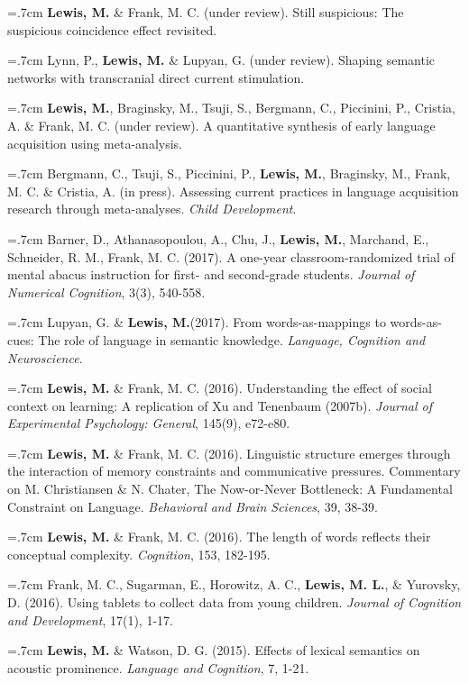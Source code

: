 \documentclass[letterpaper]{article}
\begin{document}
\onehalfspacing

\hangindent=.7cm {\bf Lewis, M.} \& Frank, M. C. (under review). Still suspicious: The suspicious coincidence effect revisited.

\hangindent=.7cm Lynn, P., {\bf Lewis, M.} \& Lupyan, G. (under review). Shaping semantic networks with transcranial direct current stimulation.

\hangindent=.7cm {\bf Lewis, M.}, Braginsky, M., Tsuji, S., Bergmann, C., Piccinini, P., Cristia, A. \& Frank, M. C. (under review). A quantitative synthesis of early language acquisition using meta-analysis. 
  

\hangindent=.7cm Bergmann, C., Tsuji, S., Piccinini, P., {\bf Lewis, M.}, Braginsky, M., Frank, M. C. \& Cristia, A. (in press). Assessing current practices in language acquisition research through meta-analyses. {\it Child Development}.


\hangindent=.7cm Barner, D., Athanasopoulou, A., Chu, J., {\bf Lewis, M.}, Marchand, E., Schneider, R. M., Frank, M. C. (2017). A one-year classroom-randomized trial of mental abacus instruction for first- and second-grade students.  {\it Journal of Numerical Cognition}, 3(3), 540-558.

\hangindent=.7cm Lupyan, G. \& {\bf Lewis, M.}(2017). From words-as-mappings to words-as-cues: The role of language in semantic knowledge. {\it Language, Cognition and Neuroscience}.

  \hangindent=.7cm {\bf Lewis, M.} \& Frank, M. C. (2016). Understanding the effect of social context on learning: A replication of Xu and Tenenbaum (2007b). {\it Journal of Experimental Psychology: General}, 145(9), e72-e80.

 \hangindent=.7cm {\bf Lewis, M.} \& Frank, M. C. (2016). Linguistic structure emerges through the interaction of memory constraints and communicative pressures. Commentary on M. Christiansen \& N. Chater, The Now-or-Never Bottleneck: A Fundamental Constraint on Language. {\it Behavioral and Brain Sciences}, 39, 38-39.
 
  \hangindent=.7cm {\bf Lewis, M.} \& Frank, M. C. (2016). The length of words reflects their conceptual complexity. {\it Cognition}, 153, 182-195.

 \hangindent=.7cm Frank, M. C., Sugarman, E., Horowitz, A. C., {\bf Lewis, M. L.}, \& Yurovsky, D. (2016). Using tablets to collect data from young children. {\it Journal of Cognition and Development}, 17(1), 1-17. 
 
  \hangindent=.7cm {\bf Lewis, M.} \& Watson, D. G. (2015). Effects of lexical semantics on acoustic prominence. { \it Language and Cognition}, 7, 1-21. 
\end{document}
